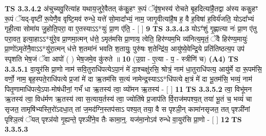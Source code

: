 \documentclass[17pt]{extarticle}
\begin{document}
                  \newline
                                \textbf{ TS 3.3.4.2} \newline
                  अ॑चुच्यवु॒रित्या॑ह यथाय॒जुरे॒वैतत् क॑कु॒हꣳ रू॒पं ॅवृ॑ष॒भस्य॑ रोचते बृ॒हदित्या॑है॒तद्वा अ॑स्य ककु॒हꣳ रू॒पं ॅयद्-वृष्टी॑ रू॒पेणै॒व वृष्टि॒मव॑ रुन्धे॒ यत्ते॑ सो॒मादा᳚भ्यं॒ नाम॒ जागृ॒वीत्या॑है॒ष ह॒ वै ह॒विषा॑ ह॒विर्य॑जति॒ योऽदा᳚भ्यं गृही॒त्वा सोमा॑य जु॒होति॒परा॒ वा ए॒तस्याऽऽ*युः॑ प्रा॒ण ए॑ति॒ - [  ] \textbf{  9} \newline
                  \newline
                                \textbf{ TS 3.3.4.3} \newline
                  योऽꣳ॑शुं गृ॒ह्णात्या नः॑ प्रा॒ण ए॑तु परा॒वत॒ इत्या॒हाऽऽ*यु॑रे॒व प्रा॒णमा॒त्मन् ध॑त्ते॒ ऽमृत॑मसि प्रा॒णाय॒ त्वेति॒ हिर॑ण्यम॒भि व्य॑नित्य॒मृतं॒ ॅवै हिर॑ण्य॒मायुः॑ प्रा॒णो॑ऽमृते॑नै॒वाऽऽ*यु॑रा॒त्मन् ध॑त्ते श॒तमा॑नं भवति श॒तायुः॒ पुरु॑षः श॒तेन्द्रि॑य॒ आयु॑ष्ये॒वेन्द्रि॒ये प्रति॑तिष्ठत्य॒प उप॑ स्पृशति भेष॒जं ॅवा आपो॑ ( ) भेष॒जमे॒व कु॑रुते ॥ \textbf{  10 } \newline
                  \newline
                      (उ॒ग्रा - ए॒त्या - प॒ - स्त्रीणि॑ च)  \textbf{(A4)} \newline \newline
                                        \textbf{ TS 3.3.5.1} \newline
                  वा॒युर॑सि प्रा॒णो नाम॑ सवि॒तुराधि॑पत्येऽपा॒नं मे॑ दा॒श्चक्षु॑रसि॒ श्रोत्रं॒ नाम॑ धा॒तुराधि॑पत्य॒ आयु॑र्मे दा रू॒पम॑सि॒ वर्णो॒ नाम॒ बृह॒स्पते॒राधि॑पत्ये प्र॒जां मे॑ दा ऋ॒तम॑सि स॒त्यं नामेन्द्र॒स्याऽऽ*धि॑पत्ये क्ष॒त्रं मे॑ दा भू॒तम॑सि॒ भव्यं॒ नाम॑ पितृ॒णामाधि॑पत्ये॒ऽपा-मोष॑धीनां॒ गर्भं॑ धा ऋ॒तस्य॑ त्वा॒ व्यो॑मन ऋ॒तस्य॑ - [  ] \textbf{  11} \newline
                  \newline
                                \textbf{ TS 3.3.5.2} \newline
                  त्वा॒ विभू॑मन ऋ॒तस्य॑ त्वा॒ विध॑र्मण ऋ॒तस्य॑ त्वा स॒त्याय॒र्तस्य॑ त्वा॒ ज्योति॑षे प्र॒जाप॑ति र्वि॒राज॑मपश्य॒त् तया॑ भू॒तं च॒ भव्यं॑ चा सृजत॒ तामृषि॑भ्यस्ति॒रो॑ऽदधा॒त् तां ज॒मद॑ग्नि॒स्तप॑साऽ पश्य॒त् तया॒ वै स पृश्ञी॒न् कामा॑नसृजत॒ तत् पृश्ञी॑नां पृश्ञि॒त्वं ॅयत् पृश्ञ॑यो गृ॒ह्यन्ते॒ पृश्ञी॑ने॒व तैः कामा॒न्॒. यज॑मा॒नोऽव॑ रुन्धे वा॒युर॑सि प्रा॒णो - [  ] \textbf{  12} \newline
                  \newline
                                \textbf{ TS 3.3.5.3} \newline
\end{document}
